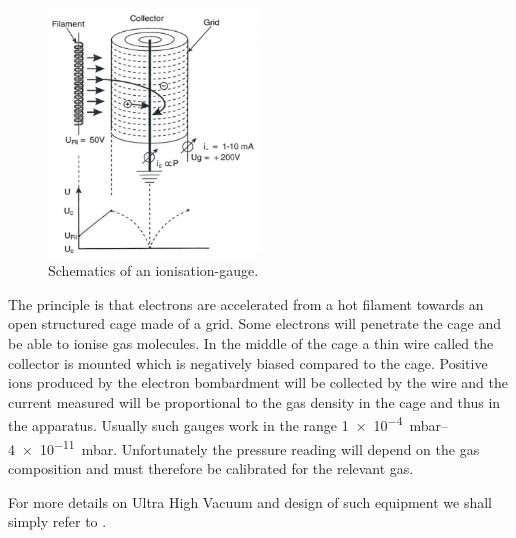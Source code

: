 \begin{figure}[htbp]
\centering
\includegraphics[width=0.5\textwidth]{figures/02_04}
\caption{Schematics of an ionisation-gauge.}
\label{fig:ion_gauge}
\end{figure}

The principle is that electrons are accelerated from a hot filament towards an open structured cage made of a grid. Some electrons will penetrate the cage and be able to ionise gas molecules. In the middle of the cage a thin wire called the collector is mounted which is negatively biased compared to the cage. Positive ions produced by the electron bombardment will be collected by the wire and the current measured will be proportional to the gas density in the cage and thus in the apparatus. Usually such gauges work in the range \SIrange{1e-4}{4e-11}{mbar}. Unfortunately the pressure reading will depend on the gas composition and must therefore be calibrated for the relevant gas.

For more details on Ultra High Vacuum and design of such equipment we shall simply refer to \cite{roth}.

